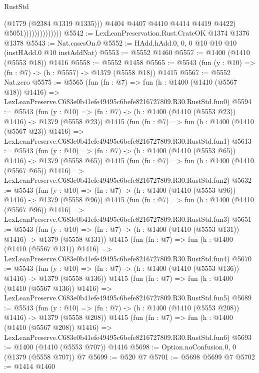 \begin{lexlean}{RustStd}
\begin{coremodule}
                                    (@1779 (@2384 @1319 @1335)))
                                  @4404
                                  @4407
                                  @4410
                                  @4414
                                  @4419
                                  @4422)
                                @5051))))))))))))))
@5542 := LexLeanPreservation.Rust.CrateOK @1374 @1376 @1378
@5543 := Nat.casesOn.{0}
@5552 := HAdd.hAdd.{0, 0, 0} @10 @10 @10 (instHAdd.{0} @10 instAddNat)
@5553 := @5552 @1460
@5557 := @1400 (@1410 (@5553 @18)) @1416
@5558 := @5552 @1458
@5565 := @5543 (fun (y : @10) => (fn : @7) -> (h : @5557) -> @1379 (@5558 @18)) @1415
@5567 := @5552 Nat.zero
@5575 := @5565
    (fun (fn : @7) =>
    fun (h : @1400 (@1410 (@5567 @18)) @1416) =>
    LexLeanPreserve.C683e0b41efe49495c6befe8216727809.R30.RustStd.fun0)
@5594 := @5543
    (fun (y : @10) => (fn : @7) -> (h : @1400 (@1410 (@5553 @23)) @1416) -> @1379 (@5558 @23))
    @1415
    (fun (fn : @7) =>
    fun (h : @1400 (@1410 (@5567 @23)) @1416) =>
    LexLeanPreserve.C683e0b41efe49495c6befe8216727809.R30.RustStd.fun1)
@5613 := @5543
    (fun (y : @10) => (fn : @7) -> (h : @1400 (@1410 (@5553 @65)) @1416) -> @1379 (@5558 @65))
    @1415
    (fun (fn : @7) =>
    fun (h : @1400 (@1410 (@5567 @65)) @1416) =>
    LexLeanPreserve.C683e0b41efe49495c6befe8216727809.R30.RustStd.fun2)
@5632 := @5543
    (fun (y : @10) => (fn : @7) -> (h : @1400 (@1410 (@5553 @96)) @1416) -> @1379 (@5558 @96))
    @1415
    (fun (fn : @7) =>
    fun (h : @1400 (@1410 (@5567 @96)) @1416) =>
    LexLeanPreserve.C683e0b41efe49495c6befe8216727809.R30.RustStd.fun3)
@5651 := @5543
    (fun (y : @10) => (fn : @7) -> (h : @1400 (@1410 (@5553 @131)) @1416) -> @1379 (@5558 @131))
    @1415
    (fun (fn : @7) =>
    fun (h : @1400 (@1410 (@5567 @131)) @1416) =>
    LexLeanPreserve.C683e0b41efe49495c6befe8216727809.R30.RustStd.fun4)
@5670 := @5543
    (fun (y : @10) => (fn : @7) -> (h : @1400 (@1410 (@5553 @136)) @1416) -> @1379 (@5558 @136))
    @1415
    (fun (fn : @7) =>
    fun (h : @1400 (@1410 (@5567 @136)) @1416) =>
    LexLeanPreserve.C683e0b41efe49495c6befe8216727809.R30.RustStd.fun5)
@5689 := @5543
    (fun (y : @10) => (fn : @7) -> (h : @1400 (@1410 (@5553 @208)) @1416) -> @1379 (@5558 @208))
    @1415
    (fun (fn : @7) =>
    fun (h : @1400 (@1410 (@5567 @208)) @1416) =>
    LexLeanPreserve.C683e0b41efe49495c6befe8216727809.R30.RustStd.fun6)
@5693 := @1400 (@1410 (@5553 @707)) @1416
@5698 := Option.noConfusion.{0, 0} (@1379 (@5558 @707)) @7
@5699 := @520 @7
@5701 := @5698 @5699 @7
@5702 := @1414 @1460

\end{coremodule}
\end{lexlean}
